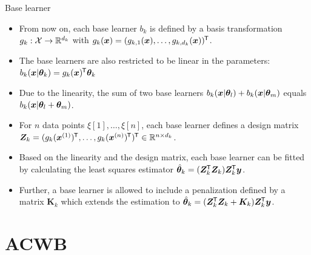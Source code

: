 \documentclass[t,10pt]{beamer}
\begin{document}
\begin{frame}{Base learner}
  \begin{itemize}
    \item
      From now on, each base learner $b_k$ is defined by a basis transformation $g_k : \Xspace \to \R^{d_k}$ with $g_k(\xv) = (g_{k,1}(\xv), \dots, g_{k,d_k}(\xv))^\tran$.

    \item
      The base learners are also restricted to be linear in the parameters: $b_k(\xv | \tb_k) = g_k(\xv)^\tran \tb_k$

    \item
      Due to the linearity, the sum of two base learners $b_k(\xv | \tb_l) + b_k(\xv | \tb_m)$ equals $b_k(\xv | \tb_l + \tb_m)$.

    \item
      For $n$ data points $\xi[1], \dots, \xi[n]$, each base learner defines a design matrix $\design_k = (g_k(\xi[1])^\tran, \dots, g_k(\xi[n])^\tran)^\tran\in\R^{n\times d_k}$.

    \item
      Based on the linearity and the design matrix, each base learner can be fitted by calculating the least squares estimator $\tbh_k = (\design_\blk^\tran \design_\blk) \design_k^\tran \yv$.

    \item
      Further, a base learner is allowed to include a penalization defined by a matrix $\bm{K}_k$ which extends the estimation to $\tbh_k = (\design_\blk^\tran \design_\blk + \bm{K}_k) \design_k^\tran \yv$.

  \end{itemize}
\end{frame}

\section*{ACWB}
\end{document}
